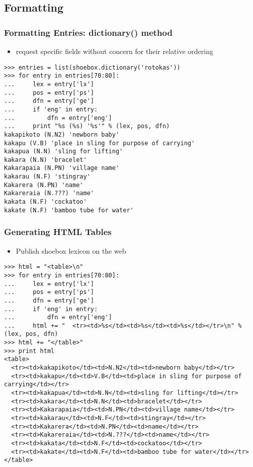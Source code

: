 \documentclass{beamer}
\begin{document}
\subsection{Formatting}

\begin{frame}[fragile]
\frametitle{Formatting Entries: dictionary() method}

\begin{itemize}
\item request specific fields without concern for their relative
  ordering
\end{itemize}
\scriptsize

\begin{verbatim}
>>> entries = list(shoebox.dictionary('rotokas'))
>>> for entry in entries[70:80]:
...     lex = entry['lx']
...     pos = entry['ps']
...     dfn = entry['ge']
...     if 'eng' in entry:
...         dfn = entry['eng']
...     print "%s (%s) '%s'" % (lex, pos, dfn)
kakapikoto (N.N2) 'newborn baby'
kakapu (V.B) 'place in sling for purpose of carrying'
kakapua (N.N) 'sling for lifting'
kakara (N.N) 'bracelet'
Kakarapaia (N.PN) 'village name'
kakarau (N.F) 'stingray'
Kakarera (N.PN) 'name'
Kakareraia (N.???) 'name'
kakata (N.F) 'cockatoo'
kakate (N.F) 'bamboo tube for water'
\end{verbatim}
\end{frame}

\begin{frame}[fragile]
\frametitle{Generating HTML Tables}

\begin{itemize}
\item Publish shoebox lexicon on the web
\end{itemize}
\scriptsize

\begin{verbatim}
>>> html = "<table>\n"
>>> for entry in entries[70:80]:
...     lex = entry['lx']
...     pos = entry['ps']
...     dfn = entry['ge']
...     if 'eng' in entry:
...         dfn = entry['eng']
...     html += "  <tr><td>%s</td><td>%s</td><td>%s</td></tr>\n" % (lex, pos, dfn)
>>> html += "</table>"
>>> print html
<table>
  <tr><td>kakapikoto</td><td>N.N2</td><td>newborn baby</td></tr>
  <tr><td>kakapu</td><td>V.B</td><td>place in sling for purpose of carrying</td></tr>
  <tr><td>kakapua</td><td>N.N</td><td>sling for lifting</td></tr>
  <tr><td>kakara</td><td>N.N</td><td>bracelet</td></tr>
  <tr><td>Kakarapaia</td><td>N.PN</td><td>village name</td></tr>
  <tr><td>kakarau</td><td>N.F</td><td>stingray</td></tr>
  <tr><td>Kakarera</td><td>N.PN</td><td>name</td></tr>
  <tr><td>Kakareraia</td><td>N.???</td><td>name</td></tr>
  <tr><td>kakata</td><td>N.F</td><td>cockatoo</td></tr>
  <tr><td>kakate</td><td>N.F</td><td>bamboo tube for water</td></tr>
</table>
\end{verbatim}
\end{frame}
\end{document}
